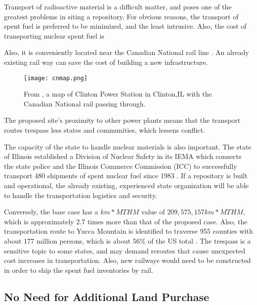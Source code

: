 Transport of radioactive material is a difficult matter, and poses one of the greatest
problems in siting a repository. For obvious reasons, the transport of spent fuel
is preferred to be minimized, and the least intrusive. Also, the cost of transporting
nuclear spent fuel is 

Also, it is conveniently located near the Canadian National rail line \cite{waleed_regional_2015}. An already existing rail way can
save the cost of building a new infrastructure.

\begin{figure}[!h] 
  \centering
  \texttt{[image: cnmap.png]}	
        \caption{From \cite{CN-national}, a map of Clinton Power Station in Clinton,IL
        with the Canadian National rail passing through.}
  \label{fig:cnmap.png}
\end{figure}

The proposed site's proximity to other power plants means that the transport
routes trespass less states and communities, which lessens conflict.

The capacity of the state to handle nuclear materials is also important.
The state of Illinois established a Division of Nuclear Safety in its \gls{IEMA}
which connects the state police and the Illinois Commerce Commission (ICC) to
 successfully transport 480 shipments of spent nuclear fuel since 1983
 \cite{IMEA}. If a repository is built and operational, the already existing,
 experienced state organization will be able to handle the transportation logistics
 and security.  

Conversely, the base case has a $km*MTHM$ value of $209,575,157 km*MTHM$, 
which is approximately 2.7 times more than that of the proposed case. Also, the 
transportation route to Yucca Mountain is identified to traverse 955 counties
with about 177 million persons, which is about 56\% of the US total
 \cite{Dilger_2015}. The trespass is a sensitive topic to some states, and may
 demand reroutes that cause unexpected cost increases in transportation. Also,
 new railways would need to be constructed in order to ship the spent fuel inventories
 by rail. 


\subsection{No Need for Additional Land Purchase}


